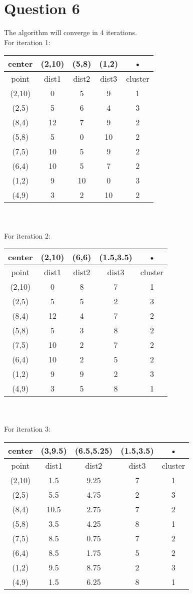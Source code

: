 \documentclass[paper=a4, fontsize=13pt]{article} %
\begin{document}
\section{Question 6}
The algorithm will converge in 4 iterations.\\
For iteration 1:\\
\begin{tabular}{|c|c|c|c|c|}
\hline 
center & (2,10) & (5,8) & (1,2) & • \\ 
\hline 
point & dist1 & dist2 & dist3 & cluster \\ 
\hline 
(2,10) & 0 & 5 & 9 & 1 \\ 
\hline 
(2,5) & 5 & 6 & 4 & 3 \\ 
\hline 
(8,4) & 12 & 7 & 9 & 2 \\ 
\hline 
(5,8) & 5 & 0 & 10 & 2 \\ 
\hline 
(7,5) & 10 & 5 & 9 & 2 \\ 
\hline 
(6,4) & 10 & 5 & 7 & 2 \\ 
\hline 
(1,2) & 9 & 10 & 0 & 3 \\ 
\hline 
(4,9) & 3 & 2 & 10 & 2 \\ 
\hline 
\end{tabular} 
\\
\\
For iteration 2:\\
\begin{tabular}{|c|c|c|c|c|}
\hline 
center & (2,10) & (6,6) & (1.5,3.5) & • \\ 
\hline 
point & dist1 & dist2 & dist3 & cluster \\ 
\hline 
(2,10) & 0 & 8 & 7 & 1 \\ 
\hline 
(2,5) & 5 & 5 & 2 & 3 \\ 
\hline 
(8,4) & 12 & 4 & 7 & 2 \\ 
\hline 
(5,8) & 5 & 3 & 8 & 2 \\ 
\hline 
(7,5) & 10 & 2 & 7 & 2 \\ 
\hline 
(6,4) & 10 & 2 & 5 & 2 \\ 
\hline 
(1,2) & 9 & 9 & 2 & 3 \\ 
\hline 
(4,9) & 3 & 5 & 8 & 1 \\ 
\hline 
\end{tabular} 
\\
\\
For iteration 3:\\
\begin{tabular}{|c|c|c|c|c|}
\hline 
center & (3,9.5) & (6.5,5.25) & (1.5,3.5) & • \\ 
\hline 
point & dist1 & dist2 & dist3 & cluster \\ 
\hline 
(2,10) & 1.5 & 9.25 & 7 & 1 \\ 
\hline 
(2,5) & 5.5 & 4.75 & 2 & 3 \\ 
\hline 
(8,4) & 10.5 & 2.75 & 7 & 2 \\ 
\hline 
(5,8) & 3.5 & 4.25 & 8 & 1 \\ 
\hline 
(7,5) & 8.5 & 0.75 & 7 & 2 \\ 
\hline 
(6,4) & 8.5 & 1.75 & 5 & 2 \\ 
\hline 
(1,2) & 9.5 & 8.75 & 2 & 3 \\ 
\hline 
(4,9) & 1.5 & 6.25 & 8 & 1 \\ 
\hline 
\end{tabular} 
\end{document}
